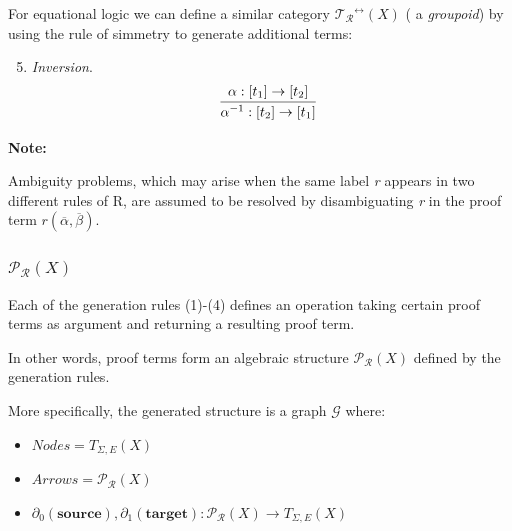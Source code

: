 \documentclass{beamer}
\begin{document}
\begin{frame}
    For equational logic we can define a similar category $\mathcal{T_R}^{\leftrightarrow}(X)$ ( a \emph{groupoid}) by using 
    the rule of simmetry to generate additional terms:
    
    \bigskip 
    {
    \scriptsize
    \begin{enumerate}
        \setcounter{enumi}{4}
        \item  \emph{Inversion}. 
        $$
        \infer[]{\alpha^{-1} : [t_2] \rightarrow [t_1]}{\alpha : [t_1] \rightarrow [t_2]}
        $$
    \end{enumerate}
    }

    \bigskip
    \pause 
    \textbf{Note:}

    Ambiguity problems, which may arise when  the same label \emph{r} appears in two different rules of R, are assumed 
    to be resolved by disambiguating \emph{r}  in the proof term $r(\overline{\alpha},\overline{\beta})$.
\end{frame}
\begin{frame}
    \frametitle{$\mathcal{P_R}(X)$}

    Each of the generation rules (1)-(4) defines an operation taking certain proof terms as argument and returning 
    a resulting proof term.

    \bigskip
    \pause 
    In other words, proof terms form an algebraic structure $\mathcal{P_R}(X)$ defined by the generation rules.

    \bigskip
    \pause 
    More specifically, the generated structure is a graph $\mathcal{G}$ where: 
    \begin{itemize}
        \item $Nodes = T_{\Sigma,E}(X)$
        \item $Arrows = \mathcal{P_R}(X)$
        \item $\partial_0 (\textbf{source}), \partial_1 (\textbf{target}) : \mathcal{P_R}(X) \rightarrow T_{\Sigma,E}(X)$
    \end{itemize}
\end{frame}
\end{document}
